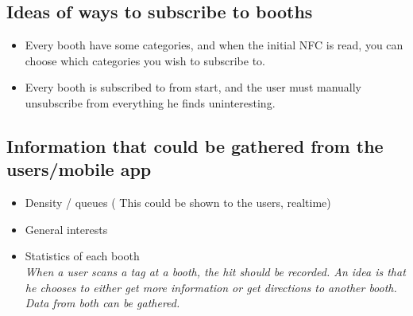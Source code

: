 \subsection*{Ideas of ways to subscribe to booths}

\begin{itemize}
\item Every booth have some categories, and when the initial NFC is read, you can choose which categories you wish to subscribe to.

\item Every booth is subscribed to from start, and the user must manually unsubscribe from everything he finds uninteresting.
\end{itemize}

\subsection*{Information that could be gathered from the users/mobile app}

\begin{itemize}
\item Density / queues ( This could be shown to the users, realtime)

\item General interests

\item Statistics of each booth\\
\textit{When a user scans a tag at a booth, the hit should be recorded. An idea is that he chooses to either get more information or get directions to another booth. Data from both can be gathered.}\citep{rtsbog}
\end{itemize}
